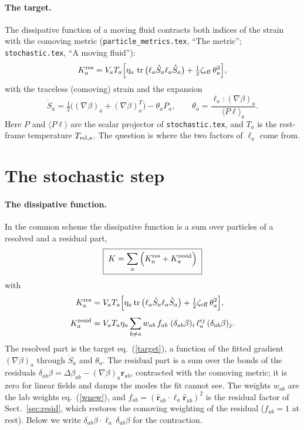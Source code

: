 \documentclass[11pt,aps,preprint,nofootinbib,superscriptaddress,tightenlines]{revtex4-2}
\def\st{\begin{equation}}
\def\stp{\end{equation}}
\def\Eq#1{eq.~(\ref{#1})}
\def\Sect#1{Sect.~\ref{#1}}
\def\tr{\operatorname{tr}}
\let\oldparagraph\paragraph
\renewcommand{\paragraph}{\par\bigskip\oldparagraph}
\begin{document}
\paragraph{The target.}  The dissipative function of a moving fluid contracts both indices of the strain
with the comoving metric (\texttt{particle\_metrics.tex}, ``The metric''; \texttt{stochastic.tex}, ``A moving fluid''):
\st
K_a^{\rm res}=V_aT_a\Big[\eta_a\,\tr\big(\ell_a\mathring S_a\ell_a\mathring S_a\big)+\tfrac12\zeta_{\rm eff}\,\theta_a^2\Big],
\label{target}
\stp
with the traceless (comoving) strain and the expansion
\st
\mathring S_a=\tfrac12\big((\nabla\beta)_a+(\nabla\beta)_a^T\big)-\theta_aP_a,\qquad
\theta_a=\frac{\ell_a{:}(\nabla\beta)_a}{\langle P\ell\rangle_a} .
\stp
Here $P$ and $\langle P\ell\rangle$ are the scalar projector of \texttt{stochastic.tex}, and $T_a$ is the rest-frame temperature
$T_{\rm rel,a}$.  The question is where the two factors of $\ell_a$ come from.

\section{The stochastic step}
\label{sec:stoch}

\paragraph{The dissipative function.}  In the common scheme the dissipative function is a sum over particles of a resolved and a
residual part,
\st
\boxed{\;K=\sum_a\Big(K_a^{\rm res}+K_a^{\rm resid}\Big)\;}
\label{Kcommon}
\stp
with
\st
\begin{aligned}
K_a^{\rm res}&=V_aT_a\Big[\eta_a\tr\big(\ell_a\mathring S_a\ell_a\mathring S_a\big)+\tfrac12\zeta_{\rm eff}\,\theta_a^2\Big],\\[4pt]
K_a^{\rm resid}&=V_aT_a\eta_a\sum_{b\neq a}w_{ab}\,f_{ab}\;(\delta_{ab}\beta)_i\,\ell_a^{ij}\,(\delta_{ab}\beta)_j .
\end{aligned}
\label{Kresid}
\stp
The resolved part is the target \Eq{target}, a function of the fitted gradient $(\nabla\beta)_a$ through $\mathring S_a$ and $\theta_a$.  The
residual part is a sum over the bonds of the residuals $\delta_{ab}\beta=\Delta\beta_{ab}-(\nabla\beta)_a\bm r_{ab}$, contracted with the
comoving metric; it is zero for linear fields and damps the modes the fit cannot see.  The weights $w_{ab}$ are the lab weights
\Eq{wnew}, and $f_{ab}=(\hat{\bm r}_{ab}\cdot\ell_a\hat{\bm r}_{ab})^2$ is the residual factor of \Sect{sec:resid}, which restores the comoving
weighting of the residual ($f_{ab}=1$ at rest).  Below we write $\delta_{ab}\beta\cdot\ell_a\,\delta_{ab}\beta$ for the contraction.
\end{document}
